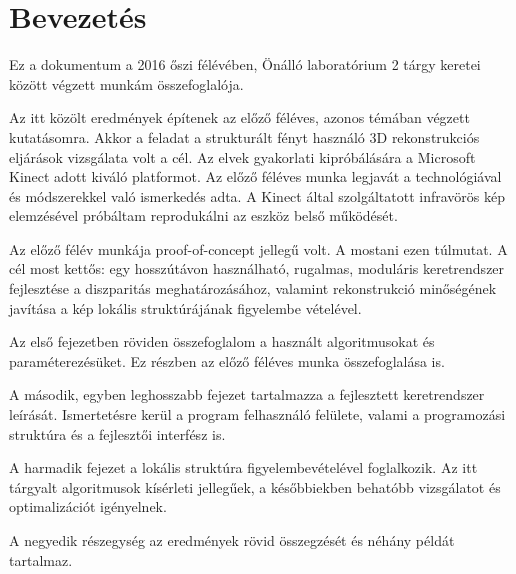 \chapter*{Bevezetés}

Ez a dokumentum a 2016 őszi félévében, Önálló laboratórium 2 tárgy keretei között végzett munkám összefoglalója.

Az itt közölt eredmények építenek az előző féléves, azonos témában végzett kutatásomra.
Akkor a feladat a strukturált fényt használó 3D rekonstrukciós eljárások vizsgálata volt a cél.
Az elvek gyakorlati kipróbálására a Microsoft Kinect adott kiváló platformot.
Az előző féléves munka legjavát a technológiával és módszerekkel való ismerkedés adta.
A Kinect által szolgáltatott infravörös kép elemzésével próbáltam reprodukálni az eszköz belső működését.

Az előző félév munkája proof-of-concept jellegű volt.
A mostani ezen túlmutat.
A cél most kettős: egy hosszútávon használható, rugalmas, moduláris keretrendszer fejlesztése a diszparitás meghatározásához, valamint rekonstrukció minőségének javítása a kép lokális struktúrájának figyelembe vételével.

Az első fejezetben röviden összefoglalom a használt algoritmusokat és paraméterezésüket.
Ez részben az előző féléves munka összefoglalása is.

A második, egyben leghosszabb fejezet tartalmazza a fejlesztett keretrendszer leírását.
Ismertetésre kerül a program felhasználó felülete, valami a programozási struktúra és a fejlesztői interfész is.

A harmadik fejezet a lokális struktúra figyelembevételével foglalkozik.
Az itt tárgyalt algoritmusok kísérleti jellegűek, a későbbiekben behatóbb vizsgálatot és optimalizációt igényelnek.

A negyedik részegység az eredmények rövid összegzését és néhány példát tartalmaz.
